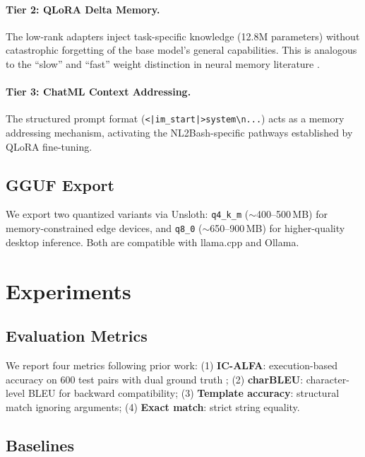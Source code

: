 \documentclass[11pt,a4paper]{article}
\begin{document}
\paragraph{Tier 2: QLoRA Delta Memory.}
The low-rank adapters inject task-specific knowledge (12.8M parameters) without catastrophic forgetting of the base model's general capabilities.
This is analogous to the ``slow'' and ``fast'' weight distinction in neural memory literature \cite{sun2025}.

\paragraph{Tier 3: ChatML Context Addressing.}
The structured prompt format (\texttt{<|im\_start|>system\textbackslash n...}) acts as a memory addressing mechanism, activating the NL2Bash-specific pathways established by QLoRA fine-tuning.

\subsection{GGUF Export}

We export two quantized variants via Unsloth:
\texttt{q4\_k\_m} ($\sim$400--500\,MB) for memory-constrained edge devices, and
\texttt{q8\_0} ($\sim$650--900\,MB) for higher-quality desktop inference.
Both are compatible with llama.cpp and Ollama.

\section{Experiments}

\subsection{Evaluation Metrics}

We report four metrics following prior work:
(1) \textbf{IC-ALFA}: execution-based accuracy on 600 test pairs with dual ground truth \cite{westenfelder2025};
(2) \textbf{charBLEU}: character-level BLEU for backward compatibility;
(3) \textbf{Template accuracy}: structural match ignoring arguments;
(4) \textbf{Exact match}: strict string equality.

\subsection{Baselines}
\end{document}
